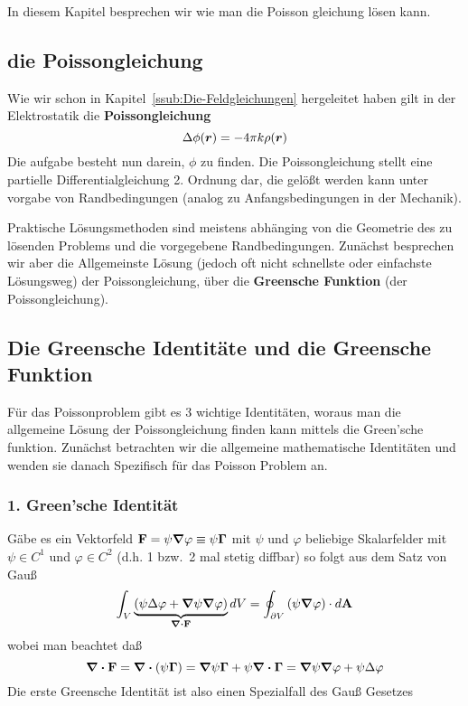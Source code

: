 In diesem Kapitel besprechen wir wie man die Poisson gleichung lösen kann.

\subsection{die Poissongleichung}%
\label{ssub:poissongleichung}

Wie wir schon in Kapitel~\ref{ssub:Die-Feldgleichungen} hergeleitet haben
gilt in der Elektrostatik die \textbf{Poissongleichung}
\begin{equation*}
  \Delta \phi (\vb*r) = -4\pi k \rho(\vb*r)
\end{equation*}
Die aufgabe besteht nun darein, $\phi$ zu finden. Die Poissongleichung 
stellt eine partielle Differentialgleichung 2. Ordnung dar, die gelößt
werden kann unter vorgabe von Randbedingungen (analog zu Anfangsbedingungen
in der Mechanik). 

Praktische Lösungsmethoden sind meistens abhänging von die Geometrie
des zu lösenden Problems und die vorgegebene Randbedingungen. 
Zunächst besprechen wir aber die Allgemeinste 
Lösung (jedoch oft nicht schnellste oder einfachste Lösungsweg) der
Poissongleichung, über die \textbf{Greensche Funktion} (der Poissongleichung).

\subsection{Die Greensche Identitäte und die Greensche Funktion}%
\label{sub:green}

Für das Poissonproblem gibt es 3 wichtige Identitäten, 
woraus man die allgemeine Lösung der Poissongleichung finden kann 
mittels die Green'sche funktion. Zunächst betrachten wir die allgemeine
mathematische Identitäten und wenden sie danach Spezifisch für das Poisson
Problem an.

\subsubsection{1. Green'sche Identität}%
\label{ssub:green-id-1}
Gäbe es ein Vektorfeld $\vb F = \psi \grad \varphi \equiv \psi \vb \Gamma$ 
mit $\psi$ und $\varphi$ beliebige Skalarfelder mit $\psi\in C^1$ und
$\varphi\in C^2$ (d.h. 1 bzw.\ 2 mal stetig diffbar) so folgt aus dem 
Satz von Gauß
\begin{equation}
  \int_V \underbrace{\qty(\psi\Delta\varphi + 
  \grad\psi\grad\varphi)}_{\div\vb F}dV =
  \oint_{\partial V} \qty(\psi\grad\varphi) \cdot d\vb A
\end{equation}
wobei man beachtet daß
\begin{equation*}
  \div \vb F =\div (\psi \vb \Gamma) = 
  \grad \psi \vb \Gamma + \psi\div\vb \Gamma = \grad \psi \grad \varphi + 
  \psi \Delta \varphi
\end{equation*}
Die erste Greensche Identität ist also einen Spezialfall des Gauß Gesetzes

